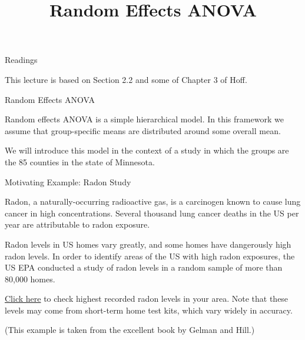 \documentclass[ignorenonframetext,]{beamer}
\title{Random Effects ANOVA}
\date{}
\begin{document}
\frame{\titlepage}

\begin{frame}{Readings}

This lecture is based on Section 2.2 and some of Chapter 3 of Hoff.

\end{frame}

\begin{frame}{Random Effects ANOVA}

Random effects ANOVA is a simple hierarchical model. In this framework
we assume that group-specific means are distributed around some overall
mean.

We will introduce this model in the context of a study in which the
groups are the 85 counties in the state of Minnesota.

\end{frame}

\begin{frame}{Motivating Example: Radon Study}

Radon, a naturally-occurring radioactive gas, is a carcinogen known to
cause lung cancer in high concentrations. Several thousand lung cancer
deaths in the US per year are attributable to radon exposure.

Radon levels in US homes vary greatly, and some homes have dangerously
high radon levels. In order to identify areas of the US with high radon
exposures, the US EPA conducted a study of radon levels in a random
sample of more than 80,000 homes.

\href{http://www.ncradon.org/ncradon/}{Click here} to check highest
recorded radon levels in your area. Note that these levels may come from
short-term home test kits, which vary widely in accuracy.

(This example is taken from the excellent book by Gelman and Hill.)

\end{frame}
\end{document}
